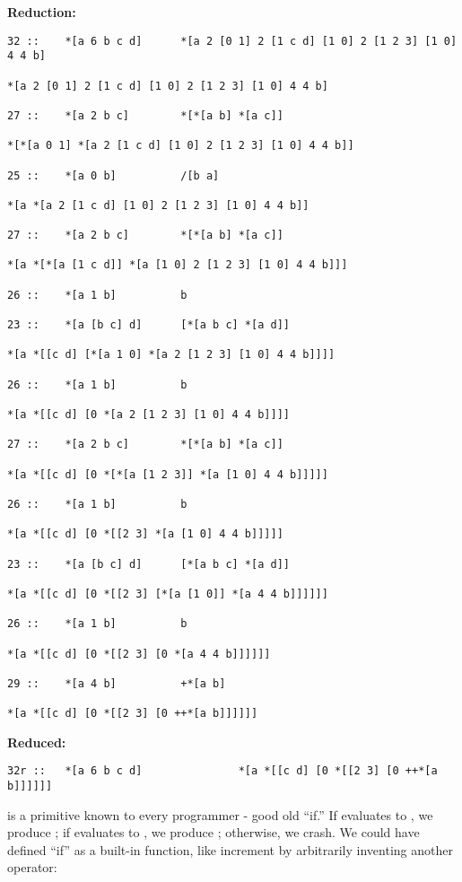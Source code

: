 \textbf{ Reduction:}

\begin{framed_shaded}
\begin{Verbatim}[fontsize=\relsize{-2.5},commandchars=\\\{\}]
32 ::    *[a 6 b c d]      *[a 2 [0 1] 2 [1 c d] [1 0] 2 [1 2 3] [1 0] 4 4 b]

*[a 2 [0 1] 2 [1 c d] [1 0] 2 [1 2 3] [1 0] 4 4 b]

27 ::    *[a 2 b c]        *[*[a b] *[a c]]

*[*[a 0 1] *[a 2 [1 c d] [1 0] 2 [1 2 3] [1 0] 4 4 b]]

25 ::    *[a 0 b]          /[b a]

*[a *[a 2 [1 c d] [1 0] 2 [1 2 3] [1 0] 4 4 b]]

27 ::    *[a 2 b c]        *[*[a b] *[a c]]

*[a *[*[a [1 c d]] *[a [1 0] 2 [1 2 3] [1 0] 4 4 b]]]

26 ::    *[a 1 b]          b

23 ::    *[a [b c] d]      [*[a b c] *[a d]]

*[a *[[c d] [*[a 1 0] *[a 2 [1 2 3] [1 0] 4 4 b]]]]

26 ::    *[a 1 b]          b

*[a *[[c d] [0 *[a 2 [1 2 3] [1 0] 4 4 b]]]]

27 ::    *[a 2 b c]        *[*[a b] *[a c]]

*[a *[[c d] [0 *[*[a [1 2 3]] *[a [1 0] 4 4 b]]]]]

26 ::    *[a 1 b]          b

*[a *[[c d] [0 *[[2 3] *[a [1 0] 4 4 b]]]]]

23 ::    *[a [b c] d]      [*[a b c] *[a d]]

*[a *[[c d] [0 *[[2 3] [*[a [1 0]] *[a 4 4 b]]]]]]

26 ::    *[a 1 b]          b

*[a *[[c d] [0 *[[2 3] [0 *[a 4 4 b]]]]]]

29 ::    *[a 4 b]          +*[a b]

*[a *[[c d] [0 *[[2 3] [0 ++*[a b]]]]]]
\end{Verbatim}
\end{framed_shaded}

\textbf{ Reduced:}
\begin{framed_shaded}
\begin{Verbatim}[fontsize=\relsize{-2.5},commandchars=\\\{\}]
	32r ::   *[a 6 b c d]               *[a *[[c d] [0 *[[2 3] [0 ++*[a b]]]]]]
\end{Verbatim}
\end{framed_shaded}
 is a primitive known to every programmer - good old ``if.''  If  evaluates
to , we produce ; if  evaluates to , we produce ; otherwise, we
crash. We could have defined ``if'' as a built-in function, like increment
by arbitrarily inventing another operator:

